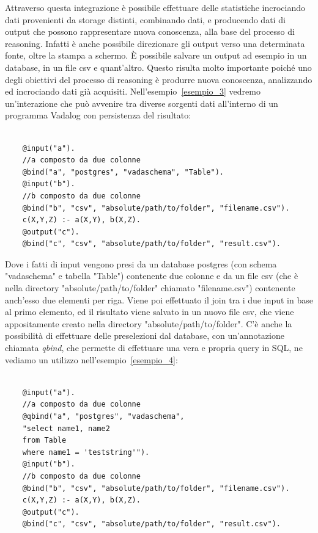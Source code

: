Attraverso questa integrazione è possibile effettuare delle statistiche incrociando dati provenienti da storage distinti, combinando dati, e producendo dati di output che possono rappresentare nuova conoscenza, alla base del processo di reasoning. \newline
Infatti è anche possibile direzionare gli output verso una determinata fonte, oltre la stampa a schermo. È possibile salvare un output ad esempio in un database, in un file csv e quant'altro. \newline 
Questo risulta molto importante poiché uno degli obiettivi del processo di reasoning è produrre nuova conoscenza, analizzando ed incrociando dati già acquisiti. \newline 
 Nell'esempio~\ref{esempio_3} vedremo un'interazione che può avvenire tra diverse sorgenti dati all'interno di un programma Vadalog con persistenza del risultato: 
\begin{example}\label{esempio_3}
\normalfont
{}
\begin{lstlisting}

	@input("a"). 
	//a composto da due colonne 
	@bind("a", "postgres", "vadaschema", "Table"). 
	@input("b"). 
	//b composto da due colonne 
	@bind("b", "csv", "absolute/path/to/folder", "filename.csv"). 
	c(X,Y,Z) :- a(X,Y), b(X,Z). 
	@output("c"). 
	@bind("c", "csv", "absolute/path/to/folder", "result.csv").
\end{lstlisting}
\end{example} 
Dove i fatti di input vengono presi da un database postgres (con schema "vadaschema" e tabella "Table") contenente due colonne e da un file csv (che è nella directory "absolute/path/to/folder" chiamato "filename.csv") contenente anch'esso due elementi per riga. Viene poi effettuato il join tra i due input in base al primo elemento, ed il risultato viene salvato in un nuovo file csv, che viene appositamente creato nella directory "absolute/path/to/folder". \newline 
C'è anche la possibilità di effettuare delle preselezioni dal database, con un'annotazione chiamata \emph{qbind}, che permette di effettuare una vera e propria query in SQL, ne vediamo un utilizzo nell'esempio~\ref{esempio_4}:
\begin{example}\label{esempio_4}
\normalfont
{}
\begin{lstlisting}

	@input("a"). 
	//a composto da due colonne 
	@qbind("a", "postgres", "vadaschema", 
	"select name1, name2
	from Table
	where name1 = 'teststring'"). 
	@input("b"). 
	//b composto da due colonne 
	@bind("b", "csv", "absolute/path/to/folder", "filename.csv"). 
	c(X,Y,Z) :- a(X,Y), b(X,Z). 
	@output("c"). 
	@bind("c", "csv", "absolute/path/to/folder", "result.csv").
\end{lstlisting}
\end{example} 
